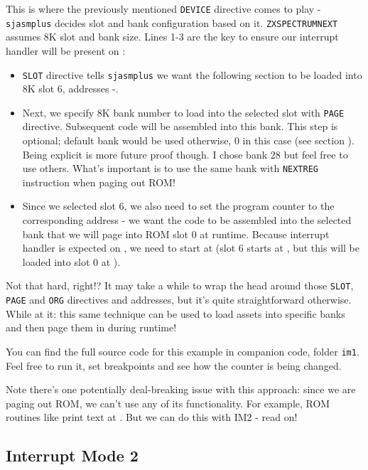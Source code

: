 This is where the previously mentioned {\tt DEVICE} directive comes to play - {\tt sjasmplus} decides slot and bank configuration based on it. {\tt ZXSPECTRUMNEXT} assumes 8K slot and bank size. Lines 1-3 are the key to ensure our interrupt handler will be present on :

\begin{itemize}
	\item {\tt SLOT} directive tells {\tt sjasmplus} we want the following section to be loaded into 8K slot 6, addresses -.
	
	\item Next, we specify 8K bank number to load into the selected slot with {\tt PAGE} directive. Subsequent code will be assembled into this bank. This step is optional; default bank would be used otherwise, 0 in this case (see section ). Being explicit is more future proof though. I chose bank 28 but feel free to use others. What's important is to use the same bank with {\tt NEXTREG} instruction when paging out ROM!
	
	\item Since we selected slot 6, we also need to set the program counter to the corresponding address - we want the code to be assembled into the selected bank that we will page into ROM slot 0 at runtime. Because interrupt handler is expected on , we need to start at  (slot 6 starts at , but this will be loaded into slot 0 at ).
\end{itemize}

Not that hard, right!? It may take a while to wrap the head around those {\tt SLOT}, {\tt PAGE} and {\tt ORG} directives and addresses, but it's quite straightforward otherwise. While at it: this same technique can be used to load assets into specific banks and then page them in during runtime!

You can find the full source code for this example in companion code, folder {\tt im1}. Feel free to run it, set breakpoints and see how the counter is being changed.

Note there's one potentially deal-breaking issue with this approach: since we are paging out ROM, we can't use any of its functionality. For example, ROM routines like print text at . But we can do this with IM2 - read on!


\subsection{Interrupt Mode 2}

